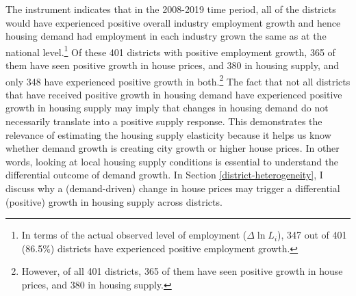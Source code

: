 \documentclass[
  12pt,
]{article}
\begin{document}
The instrument indicates that in the 2008-2019 time period, all of the districts would have experienced positive overall industry employment growth and hence housing demand had employment in each industry grown the same as at the national level.\footnote{In terms of the actual observed level of employment (\(\Delta\ln{ L_i}\)), 347 out of 401 (86.5\%) districts have experienced positive employment growth.}
Of these 401 districts with positive employment growth, 365 of them have seen positive growth in house prices, and 380 in housing supply, and only 348 have experienced positive growth in both.\footnote{However, of all 401 districts, 365 of them have seen positive growth in house prices, and 380 in housing supply.} The fact that not all districts that have received positive growth in housing demand have experienced positive growth in housing supply may imply that changes in housing demand do not necessarily translate into a positive supply response. This demonstrates the relevance of estimating the housing supply elasticity because it helps us know whether demand growth is creating city growth or higher house prices. In other words, looking at local housing supply conditions is essential to understand the differential outcome of demand growth. In Section \ref{district-heterogeneity}, I discuss why a (demand-driven) change in house prices may trigger a differential (positive) growth in housing supply across districts.
\end{document}
